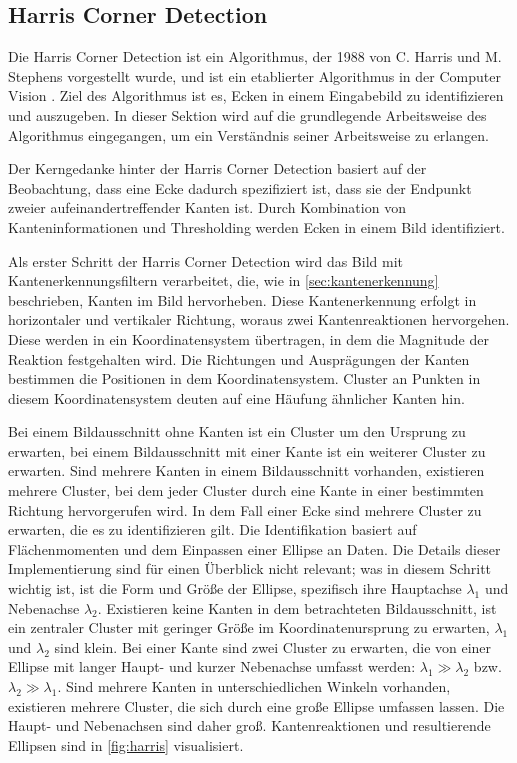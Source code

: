\subsection{Harris Corner Detection}
\label{sec:harris_corners}

Die Harris Corner Detection ist ein Algorithmus, der 1988 von C. Harris und M. Stephens vorgestellt wurde, und ist ein etablierter Algorithmus in der Computer Vision \cite{harris_corners}. Ziel des Algorithmus ist es, Ecken in einem Eingabebild zu identifizieren und auszugeben. In dieser Sektion wird auf die grundlegende Arbeitsweise des Algorithmus eingegangen, um ein Verständnis seiner Arbeitsweise zu erlangen.

Der Kerngedanke hinter der Harris Corner Detection basiert auf der Beobachtung, dass eine Ecke dadurch spezifiziert ist, dass sie der Endpunkt zweier aufeinandertreffender Kanten ist. Durch Kombination von Kanteninformationen und Thresholding werden Ecken in einem Bild identifiziert.

Als erster Schritt der Harris Corner Detection wird das Bild mit Kantenerkennungsfiltern verarbeitet, die, wie in \autoref{sec:kantenerkennung} beschrieben, Kanten im Bild hervorheben. Diese Kantenerkennung erfolgt in horizontaler und vertikaler Richtung, woraus zwei Kantenreaktionen hervorgehen. Diese werden in ein Koordinatensystem übertragen, in dem die Magnitude der Reaktion festgehalten wird. Die Richtungen und Ausprägungen der Kanten bestimmen die Positionen in dem Koordinatensystem. Cluster an Punkten in diesem Koordinatensystem deuten auf eine Häufung ähnlicher Kanten hin.

Bei einem Bildausschnitt ohne Kanten ist ein Cluster um den Ursprung zu erwarten, bei einem Bildausschnitt mit einer Kante ist ein weiterer Cluster zu erwarten. Sind mehrere Kanten in einem Bildausschnitt vorhanden, existieren mehrere Cluster, bei dem jeder Cluster durch eine Kante in einer bestimmten Richtung hervorgerufen wird. In dem Fall einer Ecke sind mehrere Cluster zu erwarten, die es zu identifizieren gilt. Die Identifikation basiert auf Flächenmomenten und dem Einpassen einer Ellipse an Daten. Die Details dieser Implementierung sind für einen Überblick nicht relevant; was in diesem Schritt wichtig ist, ist die Form und Größe der Ellipse, spezifisch ihre Hauptachse $\lambda_1$ und Nebenachse $\lambda_2$. Existieren keine Kanten in dem betrachteten Bildausschnitt, ist ein zentraler Cluster mit geringer Größe im Koordinatenursprung zu erwarten, $\lambda_1$ und $\lambda_2$ sind klein. Bei einer Kante sind zwei Cluster zu erwarten, die von einer Ellipse mit langer Haupt- und kurzer Nebenachse umfasst werden: $\lambda_1 \gg \lambda_2$ bzw. $\lambda_2 \gg \lambda_1$. Sind mehrere Kanten in unterschiedlichen Winkeln vorhanden, existieren mehrere Cluster, die sich durch eine große Ellipse umfassen lassen. Die Haupt- und Nebenachsen sind daher groß. Kantenreaktionen und resultierende Ellipsen sind in \autoref{fig:harris} visualisiert.

